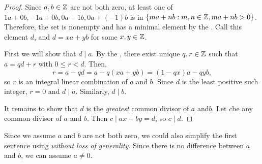 \documentclass{ximera}
\begin{document}
\begin{proof}
  Since $a,b\in\mathbb Z$ are not both zero, at least one of $1a+0b, -1a+0b, 0a+1b, 0a+(-1)b$ is in $\{ma+nb:m,n\in\mathbb Z, ma+nb>0\}$. Therefore, the set is nonempty and has a minimal element by the . Call this element $d$, and $d=xa+yb$ for some $x,y\in \mathbb Z$.
 
  First we will show that $d\mid a$. By the , there exist unique $q,r\in\mathbb Z$ such that $a=qd+r$ with $0\leq r<d$. Then, \[r=a-qd=a-q(xa+yb)=(1-qx)a-qyb,\] so $r$ is an integral linear combination of $a$ and $b$.  Since $d$ is the least positive such integer, $r=0$ and $d\mid a$. Similarly, $d\mid b$. 

  It remains to show that $d$ is the \emph{greatest} common divisor of $a$ and$b$. Let $c$be any common divisor of $a$  and $b$. Then $c\mid ax+by=d$, so $c\mid d$.
\end{proof}

Since we assume $a$ and $b$ are not both zero, we could also simplify the first sentence using \emph{without loss of generality}. Since there is no difference between $a$ and $b$, we can assume $a\neq0$.

\end{document}
